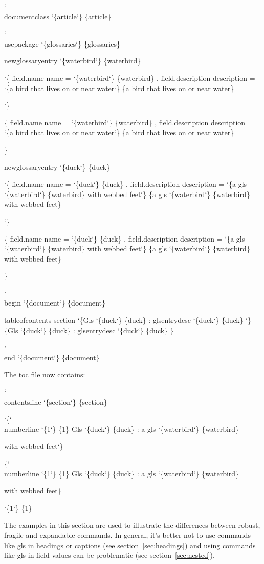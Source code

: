 \documentclass[titlepage=false,fontsize=12pt,captions=tableheading]{scrreprt}
\makeatletter
\newcommand*{\csfmtfont}[1]{\texttt{#1}}
\newcommand*{\styfmt}[1]{\texorpdfstring{\textsf{#1}}{#1}}
\newcommand*{\abbrstylefmt}[1]{\texorpdfstring{\textsf{\color{style}#1}}{#1}}
\newcommand*{\catattrfmt}[1]{\texorpdfstring{\textsf{\color{attribute}#1}}{#1}}
\newcommand*{\counterfmt}[1]{\texorpdfstring{\textsf{#1}}{#1}}
\newcommand*{\marg}[1]{\texorpdfstring
 {\discretionary{}{}{}\char`\{#1\char`\} }%
 {\{#1\}}%
}
\newenvironment{codeenv}
 {%
 \renewcommand{\glslinkpresetkeys}{\setkeys{glslink}{noindex}}%
   \def\cmd{\char`\\}%
   \def\comment##1{\textcolor{comment}{\%\ ##1}}%
   \renewcommand*{\styfmt}[1]{##1}%
   \renewcommand*{\counterfmt}[1]{##1}%
   \renewcommand*{\catattrfmt}[1]{\textcolor{attribute}{##1}}%
   \renewcommand*{\abbrstylefmt}[1]{\textcolor{style}{##1}}%
   \renewcommand*{\csfmtfont}[1]{\textcolor{cs}{##1}}%
    \begin{flushleft}\textcolor{lightgray}{\hrulefill}\par\nopagebreak
     \medskip\nopagebreak
     \ttfamily\obeylines\frenchspacing\@vobeyspaces}
 {\nopagebreak\textcolor{lightgray}{\hrulefill}%
  \end{flushleft}\ignorespacesafterend}
\newcommand{\idx}{\gls}
\newcommand{\ext}{\gls}
\newcommand*{\field}[1]{%
 \texorpdfstring
 {\gls{field.#1}}%
 {#1}%
}
\newlength\borderedboxwidth
\newenvironment{important}{%
  \setlength{\fboxrule}{4pt}%
  \setlength\borderedboxwidth{\linewidth}%
  \addtolength\borderedboxwidth{-2\fboxsep}%
  \addtolength\borderedboxwidth{-2\fboxrule}%
  \begin{lrbox}{\borderedboxcontents}%
    \begin{minipage}{\borderedboxwidth}%
    \raggedright
    \setlength\parindent{1em}%
    \noindent\ignorespaces
}%
{%
    \end{minipage}%
  \end{lrbox}%
  \par\vskip10pt\noindent
  \fcolorbox{red}{white}{\usebox{\borderedboxcontents}}\par\vskip10pt
  \noindent\ignorespacesafterend
}
\newcommand*{\sectionref}[1]{section~\ref{#1}}
\let\texorpdfstring\@secondoftwo
\makeatother
\begin{document}
\begin{codeenv}
\cmd{documentclass}\marg{article}
\strut
\cmd{usepackage}\marg{glossaries}
\strut
\gls{newglossaryentry}\marg{waterbird}
\marg{
  \field{name}=\marg{waterbird},
  \field{description}=\marg{a bird that lives on or near water}
}
\strut
\gls{newglossaryentry}\marg{duck}
\marg{
  \field{name}=\marg{duck},
  \field{description}=\marg{a \gls{gls}\marg{waterbird} with webbed feet}
}
\strut
\cmd{begin}\marg{document}
\gls{tableofcontents}
\gls{section}\marg{\gls{Gls}\marg{duck}: \gls{glsentrydesc}\marg{duck}}
\cmd{end}\marg{document}
\end{codeenv}
The \ext{toc} file now contains:
\begin{codeenv}
\cmd{contentsline} \marg{section}\marg{\cmd{numberline} \marg{1}\gls{Gls} \marg{duck}: a \gls{gls} \marg{waterbird} 
with webbed feet}\marg{1}
\end{codeenv}

\begin{important}
The examples in this section are used to illustrate the differences
between \idx{robust}, \idx{fragile} and \idx{expandable} commands.
In general, it's better not to use commands like \gls{gls} in
headings or captions (see \sectionref{sec:headings}) and using
commands like \gls{gls} in field values can be problematic (see
\sectionref{sec:nested}).
\end{important}
\end{document}
